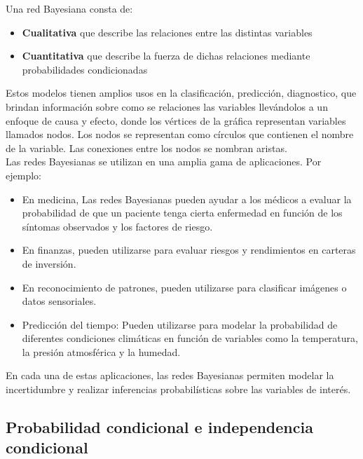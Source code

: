 Una red Bayesiana consta de:
\begin{itemize} 
    \item \textbf{Cualitativa} que describe las relaciones entre las distintas variables
    \item \textbf{Cuantitativa} que describe la fuerza de dichas relaciones mediante probabilidades condicionadas
\end{itemize}


Estos modelos tienen amplios usos en la clasificación, predicción, diagnostico, que brindan información sobre como se relaciones las variables llevándolos a un enfoque de causa y efecto, donde los vértices de la gráfica representan variables llamados nodos. Los nodos se representan como círculos que contienen el nombre de la variable. Las conexiones entre los nodos se nombran aristas.\\

Las redes Bayesianas se utilizan en una amplia gama de aplicaciones. Por ejemplo:

\begin{itemize}
    \item  En medicina, Las redes Bayesianas pueden ayudar a los médicos a evaluar la probabilidad de que un paciente tenga cierta enfermedad en función de los síntomas observados y los factores de riesgo.
    \item En finanzas, pueden utilizarse para evaluar riesgos y rendimientos en carteras de inversión.
    \item En reconocimiento de patrones, pueden utilizarse para clasificar imágenes o datos sensoriales.

    \item Predicción del tiempo: Pueden utilizarse para modelar la probabilidad de diferentes condiciones climáticas en función de variables como la temperatura, la presión atmosférica y la humedad.

\end{itemize}
En cada una de estas aplicaciones, las redes Bayesianas permiten modelar la incertidumbre y realizar inferencias probabilísticas sobre las variables de interés.

\subsection{Probabilidad condicional e independencia condicional}

